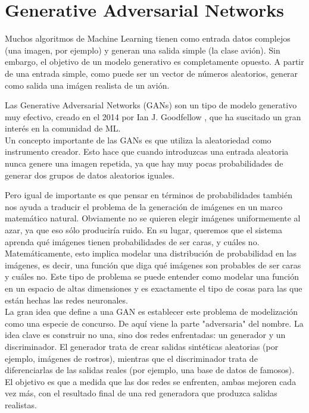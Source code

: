\clearpage




\section{Generative Adversarial Networks}

Muchos algoritmos de Machine Learning tienen como entrada datos complejos (una imagen, por ejemplo) y generan una salida simple (la clase avión). Sin embargo, el objetivo de un modelo generativo es completamente opuesto. A partir de una entrada simple, como puede ser un vector de números aleatorios, generar como salida una imágen realista de un avión.

Las Generative Adversarial Networks (GANs) son un tipo de modelo generativo muy efectivo, creado en el 2014 por Ian J. Goodfellow \cite{GANs}, que ha suscitado un gran interés en la comunidad de ML.\\

Un concepto importante de las GANs es que utiliza la aleatoriedad como instrumento creador. Esto hace que cuando introduzcas una entrada aleatoria nunca genere una imagen repetida, ya que hay muy pocas probabilidades de generar dos grupos de datos aleatorios iguales.

Pero igual de importante es que pensar en términos de probabilidades también nos ayuda a traducir el problema de la generación de imágenes en un marco matemático natural. Obviamente no se quieren elegir imágenes uniformemente al azar, ya que eso sólo produciría ruido. En su lugar, queremos que el sistema aprenda qué imágenes tienen probabilidades de ser caras, y cuáles no. Matemáticamente, esto implica modelar una distribución de probabilidad en las imágenes, es decir, una función que diga qué imágenes son probables de ser caras y cuáles no. Este tipo de problema se puede entender como modelar una función en un espacio de altas dimensiones y es exactamente el tipo de cosas para las que están hechas las redes neuronales.\\

La gran idea que define a una GAN es establecer este problema de modelización como una especie de concurso. De aquí viene la parte "adversaria" del nombre. La idea clave es construir no una, sino dos redes enfrentadas: un generador y un discriminador. El generador trata de crear salidas sintéticas aleatorias (por ejemplo, imágenes de rostros), mientras que el discriminador trata de diferenciarlas de las salidas reales (por ejemplo, una base de datos de famosos). El objetivo es que a medida que las dos redes se enfrenten, ambas mejoren cada vez más, con el resultado final de una red generadora que produzca salidas realistas.

